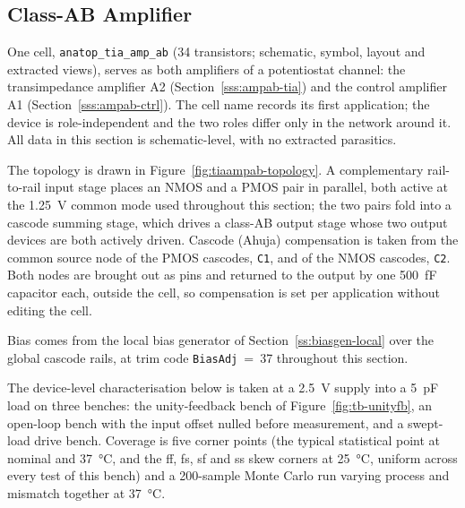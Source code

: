 %
%
%

\subsection{Class-AB Amplifier}\label{ss:ampab}

One cell, \texttt{anatop\_tia\_amp\_ab} (34 transistors; schematic, symbol, layout and
extracted views), serves as both amplifiers of a potentiostat channel: the
transimpedance amplifier A2 (Section~\ref{sss:ampab-tia}) and the control amplifier A1
(Section~\ref{sss:ampab-ctrl}). The cell name records its first application; the device
is role-independent and the two roles differ only in the network around it. All data in
this section is schematic-level, with no extracted parasitics.

The topology is drawn in Figure~\ref{fig:tiaampab-topology}. A complementary
rail-to-rail input stage places an NMOS and a PMOS pair in parallel, both active at the
\SI{1.25}{\volt} common mode used throughout this section; the two pairs fold into a
cascode summing stage, which drives a class-AB output stage whose two output devices are
both actively driven. Cascode (Ahuja) compensation is taken from the common source node
of the PMOS cascodes, \texttt{C1}, and of the NMOS cascodes, \texttt{C2}. Both nodes are
brought out as pins and returned to the output by one \SI{500}{\femto\farad} capacitor
each, outside the cell, so compensation is set per application without editing the cell.

Bias comes from the local bias generator of Section~\ref{ss:biasgen-local} over the
global cascode rails, at trim code \texttt{BiasAdj}~=~37 throughout this section.

The device-level characterisation below is taken at a \SI{2.5}{\volt} supply into a
\SI{5}{\pico\farad} load on three benches: the unity-feedback bench of
Figure~\ref{fig:tb-unityfb}, an open-loop bench with the input offset nulled before
measurement, and a swept-load drive bench. Coverage is five corner points (the
typical statistical point at nominal and \SI{37}{\celsius}, and the ff, fs, sf and ss
skew corners at \SI{25}{\celsius}, uniform across every test of this bench) and a
200-sample Monte Carlo run varying process and mismatch together at \SI{37}{\celsius}.
